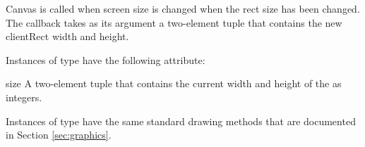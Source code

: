 \begin{classdesc}{Canvas}{}
 is called when screen size is changed when the 
 rect size has been changed. The callback takes as its argument a
two-element tuple that contains the new clientRect width and height. 

\end{classdesc}

Instances of  type have the following attribute:

\begin{memberdesc}[Canvas]{size}
A two-element tuple that contains the current width and height of the 
 as integers.
\end{memberdesc}

Instances of  type have the same standard drawing methods 
that are documented in Section \ref{sec:graphics}.

